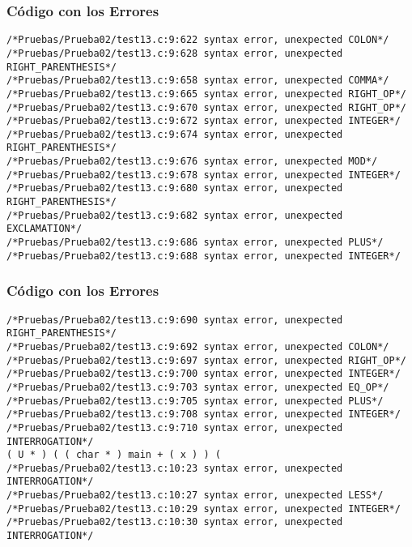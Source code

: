 \documentclass{beamer}
\begin{document}
\begin{frame}[fragile]
\frametitle{C\'odigo con los Errores}
\begin{verbatim}
/*Pruebas/Prueba02/test13.c:9:622 syntax error, unexpected COLON*/
/*Pruebas/Prueba02/test13.c:9:628 syntax error, unexpected RIGHT_PARENTHESIS*/
/*Pruebas/Prueba02/test13.c:9:658 syntax error, unexpected COMMA*/
/*Pruebas/Prueba02/test13.c:9:665 syntax error, unexpected RIGHT_OP*/
/*Pruebas/Prueba02/test13.c:9:670 syntax error, unexpected RIGHT_OP*/
/*Pruebas/Prueba02/test13.c:9:672 syntax error, unexpected INTEGER*/
/*Pruebas/Prueba02/test13.c:9:674 syntax error, unexpected RIGHT_PARENTHESIS*/
/*Pruebas/Prueba02/test13.c:9:676 syntax error, unexpected MOD*/
/*Pruebas/Prueba02/test13.c:9:678 syntax error, unexpected INTEGER*/
/*Pruebas/Prueba02/test13.c:9:680 syntax error, unexpected RIGHT_PARENTHESIS*/
/*Pruebas/Prueba02/test13.c:9:682 syntax error, unexpected EXCLAMATION*/
/*Pruebas/Prueba02/test13.c:9:686 syntax error, unexpected PLUS*/
/*Pruebas/Prueba02/test13.c:9:688 syntax error, unexpected INTEGER*/
\end{verbatim}
\end{frame}
\begin{frame}[fragile]
\frametitle{C\'odigo con los Errores}
\begin{verbatim}
/*Pruebas/Prueba02/test13.c:9:690 syntax error, unexpected RIGHT_PARENTHESIS*/
/*Pruebas/Prueba02/test13.c:9:692 syntax error, unexpected COLON*/
/*Pruebas/Prueba02/test13.c:9:697 syntax error, unexpected RIGHT_OP*/
/*Pruebas/Prueba02/test13.c:9:700 syntax error, unexpected INTEGER*/
/*Pruebas/Prueba02/test13.c:9:703 syntax error, unexpected EQ_OP*/
/*Pruebas/Prueba02/test13.c:9:705 syntax error, unexpected PLUS*/
/*Pruebas/Prueba02/test13.c:9:708 syntax error, unexpected INTEGER*/
/*Pruebas/Prueba02/test13.c:9:710 syntax error, unexpected INTERROGATION*/
( U * ) ( ( char * ) main + ( x ) ) ( 
/*Pruebas/Prueba02/test13.c:10:23 syntax error, unexpected INTERROGATION*/
/*Pruebas/Prueba02/test13.c:10:27 syntax error, unexpected LESS*/
/*Pruebas/Prueba02/test13.c:10:29 syntax error, unexpected INTEGER*/
/*Pruebas/Prueba02/test13.c:10:30 syntax error, unexpected INTERROGATION*/
\end{verbatim}
\end{frame}
\end{document}
